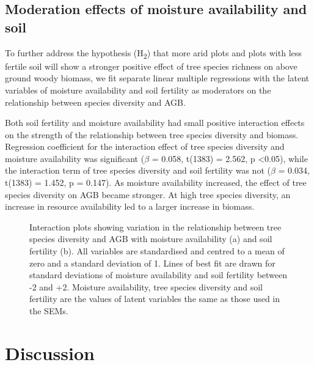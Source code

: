 \documentclass[11pt,a4paper]{article}
\begin{document}
\subsection{Moderation effects of moisture availability and soil}

To further address the hypothesis (H\textsubscript{2}) that more arid plots and plots with less fertile soil will show a stronger positive effect of tree species richness on above ground woody biomass, we fit separate linear multiple regressions with the latent variables of moisture availability and soil fertility as moderators on the relationship between species diversity and AGB.

Both soil fertility and moisture availability had small positive interaction effects on the strength of the relationship between tree species diversity and biomass. Regression coefficient for the interaction effect of tree species diversity and moisture availability was significant ($\beta$ = 0.058, t(1383) = 2.562, p <0.05), while the interaction term of tree species diversity and soil fertility was not ($\beta$ = 0.034, t(1383) = 1.452, p = 0.147). As moisture availability increased, the effect of tree species diversity on AGB became stronger. At high tree species diversity, an increase in resource availability led to a larger increase in biomass.


\begin{figure}[H]
\centering
	\caption{Interaction plots showing variation in the relationship between tree species diversity and AGB with moisture availability (a) and soil fertility (b). All variables are standardised and centred to a mean of zero and a standard deviation of 1. Lines of best fit are drawn for standard deviations of moisture availability and soil fertility between -2 and +2. Moisture availability, tree species diversity and soil fertility are the values of latent variables the same as those used in the SEMs.}
	\label{int_plots}
\end{figure}

\section{Discussion}

\end{document}
